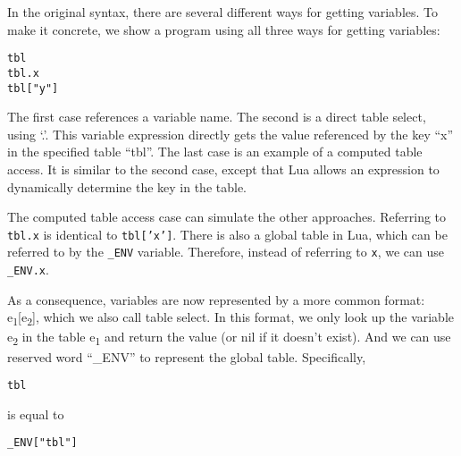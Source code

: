 In the original syntax,
there are several different ways for getting variables.
To make it concrete, we show a program using all three ways for getting variables:

\begin{verbatim}
tbl
tbl.x
tbl["y"]
\end{verbatim}

The first case references a variable name.
The second is a direct table select, using `.'.
This variable expression directly gets the value referenced by the key ``x'' in the specified table ``tbl''.
The last case is an example of a computed table access.
It is similar to the second case, except that Lua allows an expression to dynamically determine the key in the table.

The computed table access case can simulate the other approaches.
Referring to {\tt tbl.x} is identical to {\tt tbl['x']}.
There is also a global table in Lua, which can be referred to by the {\tt \_ENV} variable.
Therefore, instead of referring to {\tt x}, we can use {\tt \_ENV.x}.

As a consequence, variables are now represented by a more common format: e\textsubscript{1}[e\textsubscript{2}], which we also call table select. In this format, we only look up the variable e\textsubscript{2} in the table e\textsubscript{1} and return the value (or nil if it doesn't exist). And we can use reserved word ``\_ENV'' to represent the global table. Specifically,

\begin{verbatim}
tbl
\end{verbatim}
is equal to
\begin{verbatim}
_ENV["tbl"]
\end{verbatim}

